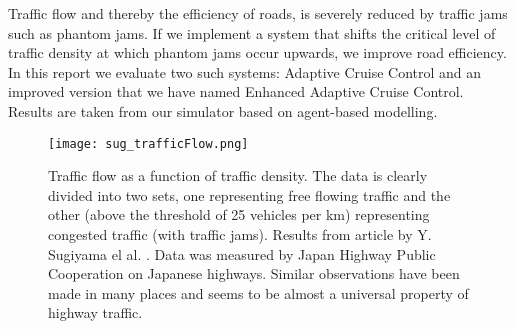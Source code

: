Traffic flow and thereby the efficiency of roads, is severely reduced by
traffic jams such as phantom jams. If we implement a system that shifts
the critical level of traffic density at which phantom jams occur upwards,
we improve road efficiency. In this report we evaluate two such systems:
Adaptive Cruise Control and an improved version that we have named Enhanced
Adaptive Cruise Control. Results are taken from our simulator based on
agent-based modelling.

\begin{figure}[H]
    \begin{center}
    \texttt{[image: sug\_trafficFlow.png]}
    \caption{\label{sug_flow}
Traffic flow as a function of traffic density. The data is clearly divided
into two sets, one representing free flowing traffic and the other (above the
threshold of 25 vehicles per km) representing congested traffic (with traffic
jams).  Results from article by Y. Sugiyama el al. \cite{sugiyama}.  Data was
measured by Japan Highway Public Cooperation on Japanese highways. Similar
observations have been made in many places and seems to be almost a universal
property of highway traffic.}
    \end{center}
\end{figure}

